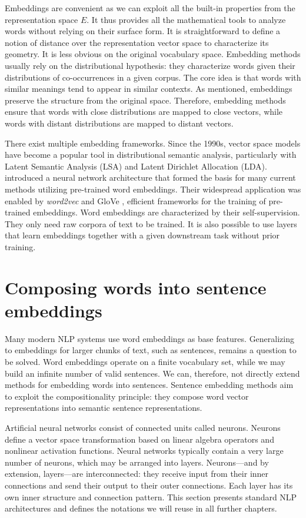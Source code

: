 Embeddings are convenient as we can exploit all the built-in properties from the representation space $E$. It thus provides all the mathematical tools to analyze words without relying on their surface form. It is straightforward to define a notion of distance over the representation vector space to characterize its geometry. It is less obvious on the original vocabulary space. Embedding methods usually rely on the distributional hypothesis: they characterize words given their distributions of co-occurrences in a given corpus. The core idea is that words with similar meanings tend to appear in similar contexts. As mentioned, embeddings preserve the structure from the original space. Therefore, embedding methods ensure that words with close distributions are mapped to close vectors, while words with distant distributions are mapped to distant vectors.

There exist multiple embedding frameworks. Since the 1990s, vector space models have become a popular tool in distributional semantic analysis, particularly with Latent Semantic Analysis (LSA) and Latent Dirichlet Allocation (LDA). \textcite{collobert_08} introduced a neural network architecture that formed the basis for many current methods utilizing pre-trained word embeddings. Their widespread application was enabled by \textsl{word2vec} \parencite{mikolov_13a, mikolov_13b} and GloVe \parencite{pennington_14}, efficient frameworks for the training of pre-trained embeddings. Word embeddings are characterized by their self-supervision. They only need raw corpora of text to be trained. It is also possible to use layers that learn embeddings together with a given downstream task without prior training.

\section{Composing words into sentence embeddings}

Many modern NLP systems use word embeddings as base features. Generalizing to embeddings for larger chunks of text, such as sentences, remains a question to be solved. Word embeddings operate on a finite vocabulary set, while we may build an infinite number of valid sentences. We can, therefore, not directly extend methods for embedding words into sentences. Sentence embedding methods aim to exploit the compositionality principle: they compose word vector representations into semantic sentence representations.

Artificial neural networks consist of connected units called neurons. Neurons define a vector space transformation based on linear algebra operators and nonlinear activation functions. Neural networks typically contain a very large number of neurons, which may be arranged into layers. Neurons—and by extension, layers—are interconnected: they receive input from their inner connections and send their output to their outer connections. Each layer has its own inner structure and connection pattern. This section presents standard NLP architectures and defines the notations we will reuse in all further chapters.

